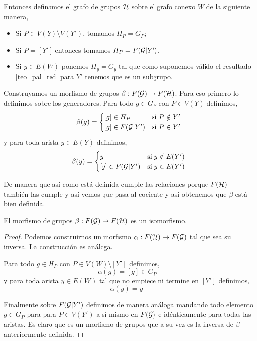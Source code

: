 \documentclass[tesis.tex]{subfiles}
\begin{document}
Entonces definamos el grafo de grupos $\cal H$ sobre el grafo conexo $W$ de la siguiente manera,
\begin{itemize}
	\item Si $P \in V(Y) \setminus V(Y')$, tomamos $H_P = G_P$;
	\item Si $P = [Y']$ entonces tomamos $H_P = F({\cal G} | Y')$.
	\item Si $y \in E(W)$ ponemos $H_y = G_y$ tal que como suponemos válido el resultado \ref{teo_pal_red} para $Y'$ tenemos que es un subgrupo.
\end{itemize}

Construyamos un morfismo de grupos $\beta:F({\cal G}) \to F({\cal H})$.
Para eso primero lo definimos sobre los generadores.
Para todo $g \in G_P$ con $P \in V(Y)$ definimos,
\begin{equation*}
	\beta(g) = 
	\begin{cases}
		[g] \in H_P & \text{si} \ P \notin Y' \\
		[g] \in F({\cal G} | Y') & \text{si} \ P \in Y'  \\ 
	\end{cases}
\end{equation*}
y para toda arista $ y \in E(Y)$ definimos,
\begin{equation*}
	\beta(y) = 
	\begin{cases}
		y  & \text{si} \ y \notin E(Y') \\
		[y] \in F({\cal G} | Y') & \text{si} \ y \in E(Y')  \\ 
	\end{cases}
\end{equation*}

De manera que así como está definida cumple las relaciones porque $F({\cal H})$ también las cumple y así vemos que pasa al cociente y así obtenemos que $\beta$ está bien definida.

\begin{lema}
	El morfismo de grupos $\beta:F({\cal G}) \to F({\cal H})$ es un isomorfismo. 
\end{lema}
\begin{proof}
	Podemos construirnos un morfismo $\alpha:F({\cal H}) \to F({\cal G})$ tal que sea su inversa.
	La construcción es análoga.
	
	Para todo $g \in H_P$ con $P \in V(W) \setminus [Y'] $ definimos,
	\begin{equation*}
		\alpha(g) = [g] \in G_P \ \ 
	\end{equation*}
	y para toda arista $ y \in E(W)$ tal que no empiece ni termine en $[Y']$ definimos,
	\begin{equation*}
		\alpha(y) = y  \ \ \ 
	\end{equation*}
	
	Finalmente sobre $F({\cal G} | Y')$ definimos de manera análoga mandando todo elemento $g \in G_P$ para para $P \in V(Y')$ a sí mismo en $F({\cal G})$ e idénticamente para todas las aristas.
	Es claro que es un morfismo de grupos que a su vez es la inversa de $\beta$ anteriormente definida.
\end{proof}
\end{document}
